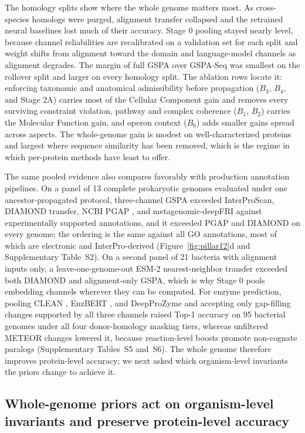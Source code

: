 \documentclass[10pt,twocolumn]{article}
\begin{document}
The homology splits show where the whole genome matters most. As cross-species homologs were purged, alignment transfer collapsed and the retrained neural baselines lost much of their accuracy. Stage 0 pooling stayed nearly level, because channel reliabilities are recalibrated on a validation set for each split and weight shifts from alignment toward the domain and language-model channels as alignment degrades. The margin of full GSPA over GSPA-Seq was smallest on the rollover split and larger on every homology split. The ablation rows locate it: enforcing taxonomic and anatomical admissibility before propagation ($B_3$, $B_4$, and Stage 2A) carries most of the Cellular Component gain and removes every surviving constraint violation, pathway and complex coherence ($B_1$, $B_2$) carries the Molecular Function gain, and operon context ($B_6$) adds smaller gains spread across aspects. The whole-genome gain is modest on well-characterized proteins and largest where sequence similarity has been removed, which is the regime in which per-protein methods have least to offer.

The same pooled evidence also compares favorably with production annotation pipelines. On a panel of 13 complete prokaryotic genomes evaluated under one ancestor-propagated protocol, three-channel GSPA exceeded InterProScan, DIAMOND transfer, NCBI PGAP \citep{li2021refseq}, and metagenomic-deepFRI \citep{bezshapkin2026scaling} against experimentally supported annotations, and it exceeded PGAP and DIAMOND on every genome; the ordering is the same against all GO annotations, most of which are electronic and InterPro-derived (Figure~\ref{fig:pillar12}d and Supplementary Table~S2). On a second panel of 21 bacteria with alignment inputs only, a leave-one-genome-out ESM-2 nearest-neighbor transfer exceeded both DIAMOND and alignment-only GSPA, which is why Stage 0 pools embedding channels wherever they can be computed. For enzyme prediction, pooling CLEAN \citep{yu2023enzyme}, EnzBERT \citep{buton2023enzbert}, and DeepProZyme \citep{kim2023dpz} and accepting only gap-filling changes supported by all three channels raised Top-1 accuracy on 95 bacterial genomes under all four donor-homology masking tiers, whereas unfiltered METEOR changes lowered it, because reaction-level boosts promote non-cognate paralogs (Supplementary Tables~S5 and~S6). The whole genome therefore improves protein-level accuracy; we next asked which organism-level invariants the priors change to achieve it.

\subsection{Whole-genome priors act on organism-level invariants and preserve protein-level accuracy}
\end{document}
